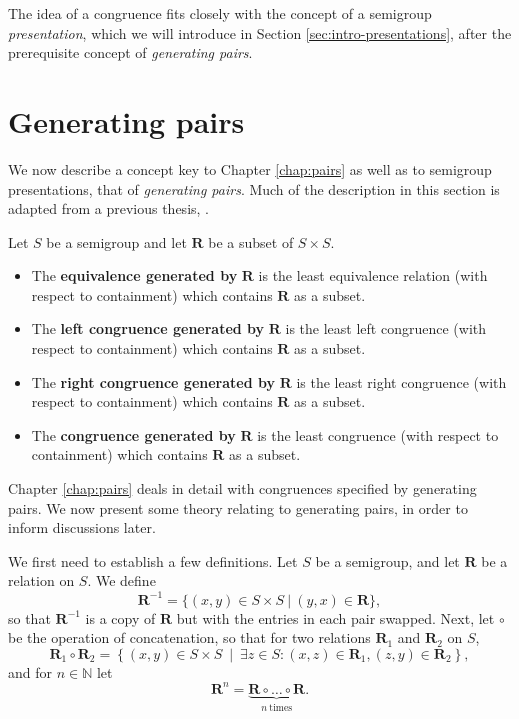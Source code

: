 The idea of a congruence fits closely with the concept of a semigroup
\textit{presentation}, which we will introduce in Section
\ref{sec:intro-presentations}, after the prerequisite concept of
\textit{generating pairs}.

\section{Generating pairs}
\label{sec:intro-gen-pairs}

We now describe a concept key to Chapter \ref{chap:pairs} as well as to
semigroup presentations, that of \textit{generating pairs}.  Much of the
description in this section is adapted from a previous thesis,
\cite{mtorpey_msc}.

\begin{definition}
  \label{def:gen-pairs}
  Let $S$ be a semigroup and let $\mathbf{R}$ be a subset of $S \times S$.
  \begin{itemize}
  \item The \textbf{equivalence generated by} $\mathbf{R}$ is the least
    equivalence relation (with respect to containment) which contains
    $\mathbf{R}$ as a subset.
  \item The \textbf{left congruence generated by} $\mathbf{R}$ is the least left
    congruence (with respect to containment) which contains $\mathbf{R}$ as a
    subset.
  \item The \textbf{right congruence generated by} $\mathbf{R}$ is the least
    right congruence (with respect to containment) which contains $\mathbf{R}$
    as a subset.
  \item The \textbf{congruence generated by} $\mathbf{R}$ is the least
    congruence (with respect to containment) which contains $\mathbf{R}$ as a
    subset.
  \end{itemize}
\end{definition}

Chapter \ref{chap:pairs} deals in detail with congruences specified by
generating pairs.  We now present some theory relating to generating pairs, in
order to inform discussions later.

We first need to establish a few definitions.  Let $S$ be a semigroup, and let
$\mathbf{R}$ be a relation on $S$.  We define
$$\mathbf{R}^{-1} = \{(x,y) \in S \times S ~|~ (y,x) \in \mathbf{R}\},$$
so that $\mathbf{R}^{-1}$ is a copy of $\mathbf{R}$ but with the entries in each
pair swapped. 
Next, let $\circ$ be the operation of concatenation, so that for two relations
$\mathbf{R}_1$ and $\mathbf{R}_2$ on $S$,
$$\mathbf{R}_1 \circ \mathbf{R}_2 = \left\{(x,y) \in S \times S ~\middle|~
  \exists z \in S: (x,z) \in \mathbf{R}_1, (z,y) \in \mathbf{R}_2\right\},$$
and for $n \in \mathbb{N}$ let
$$\mathbf{R}^n = \underbrace{\mathbf{R} \circ \dots \circ \mathbf{R}}_{n~\text{times}}.$$

